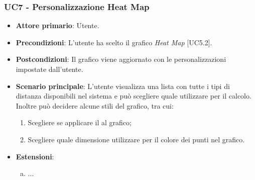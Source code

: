 \subsubsection{UC7 - Personalizzazione Heat Map}
\begin{itemize}
	\item \textbf{Attore primario}: Utente.
	
	\item \textbf{Precondizioni}: L'utente ha scelto il grafico \textit{Heat Map} [UC5.2].
	
	\item \textbf{Postcondizioni}: Il grafico viene aggiornato con le personalizzazioni impostate dall'utente.
	
	\item \textbf{Scenario principale}: L'utente visualizza una lista con tutte i tipi di distanza disponibili nel sistema e può scegliere quale utilizzare per il calcolo. Inoltre può decidere alcune stili del grafico, tra cui:
		\begin{enumerate}
			\item Scegliere se applicare il  al grafico;
				
			\item Scegliere quale dimensione utilizzare per il colore dei punti nel grafico.
				
		\end{enumerate}
		
		\item \textbf{Estensioni}:
	\begin{enumerate}[(a)]
		\item ...
	\end{enumerate}
\end{itemize}
